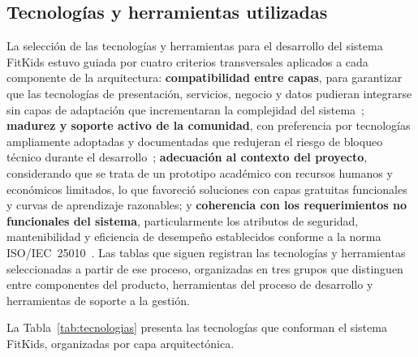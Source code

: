 			\subsection{Tecnologías y herramientas utilizadas}
				La selección de las tecnologías y herramientas para el desarrollo del sistema FitKids estuvo guiada por cuatro criterios transversales aplicados a cada componente de la arquitectura: \textbf{compatibilidad entre capas}, para garantizar que las tecnologías de presentación, servicios, negocio y datos pudieran integrarse sin capas de adaptación que incrementaran la complejidad del sistema~\cite{Kleppmann2017}; \textbf{madurez y soporte activo de la comunidad}, con preferencia por tecnologías ampliamente adoptadas y documentadas que redujeran el riesgo de bloqueo técnico durante el desarrollo~\cite{Fowler2002}; \textbf{adecuación al contexto del proyecto}, considerando que se trata de un prototipo académico con recursos humanos y económicos limitados, lo que favoreció soluciones con capas gratuitas funcionales y curvas de aprendizaje razonables; y \textbf{coherencia con los requerimientos no funcionales del sistema}, particularmente los atributos de seguridad, mantenibilidad y eficiencia de desempeño establecidos conforme a la norma ISO/IEC~25010~\cite{ISO25010,GuerreroUlloa2024}. Las tablas que siguen registran las tecnologías y herramientas seleccionadas a partir de ese proceso, organizadas en tres grupos que distinguen entre componentes del producto, herramientas del proceso de desarrollo y herramientas de soporte a la gestión.
				
				La Tabla~\ref{tab:tecnologias} presenta las tecnologías que conforman el sistema FitKids, organizadas por capa arquitectónica.
				
